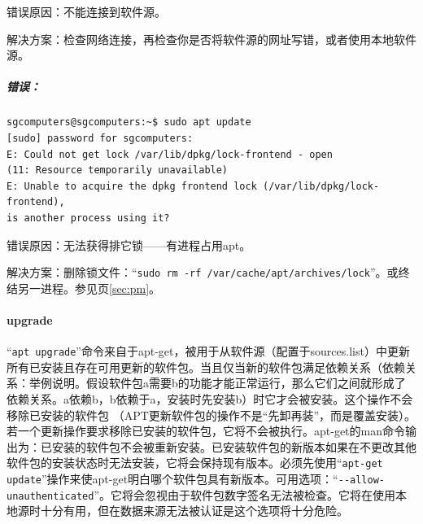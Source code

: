 错误原因：不能连接到软件源。 \par
解决方案：检查网络连接，再检查你是否将软件源的网址写错，或者使用本地软件源。 \par
\subparagraph{错误：}
\begin{verbatim}
sgcomputers@sgcomputers:~$ sudo apt update
[sudo] password for sgcomputers:
E: Could not get lock /var/lib/dpkg/lock-frontend - open 
(11: Resource temporarily unavailable)
E: Unable to acquire the dpkg frontend lock (/var/lib/dpkg/lock-frontend), 
is another process using it?
\end{verbatim} \par
错误原因：无法获得排它锁——有进程占用apt。\par
解决方案：删除锁文件：“\verb|sudo rm -rf /var/cache/apt/archives/lock|”。或终结另一进程。参见\pageref{sec:pm}页\ref{sec:pm}。
\paragraph{upgrade}
“\verb|apt upgrade|”命令来自于apt-get，被用于从软件源（配置于sources.list）中更新所有已安装且存在可用更新的软件包。当且仅当新的软件包满足依赖关系（依赖关系：举例说明。假设软件包a需要b的功能才能正常运行，那么它们之间就形成了依赖关系。a依赖b，b依赖于a，安装时先安装b）时它才会被安装。这个操作不会移除已安装的软件包 （APT更新软件包的操作不是“先卸再装”，而是覆盖安装）。若一个更新操作要求移除已安装的软件包，它将不会被执行。apt-get的man命令输出为：已安装的软件包不会被重新安装。已安装软件包的新版本如果在不更改其他软件包的安装状态时无法安装，它将会保持现有版本。必须先使用“\verb|apt-get update|”操作来使apt-get明白哪个软件包具有新版本。可用选项：“\verb|--allow-unauthenticated|”。它将会忽视由于软件包数字签名无法被检查。它将在使用本地源时十分有用，但在数据来源无法被认证是这个选项将十分危险。
